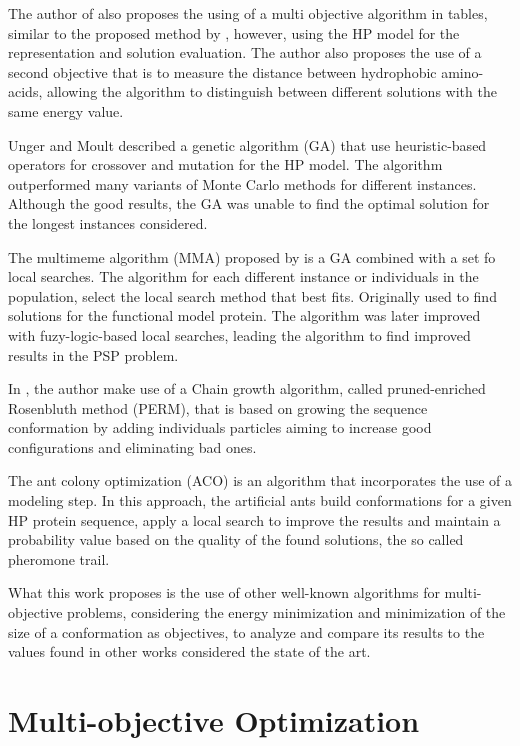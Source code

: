 The author of \cite{gabriel2012algoritmos} also proposes the using of a multi objective algorithm in tables, similar to the proposed method by \cite{soares2011investigating}, however, using the HP model for the representation and solution evaluation. The author also proposes the use of a second objective that is to measure the distance between hydrophobic amino-acids, allowing the algorithm to distinguish between different solutions with the same energy value.


Unger and Moult \cite{unger1993genetic} described a genetic algorithm (GA) that use heuristic-based operators for crossover and mutation for the HP model. The algorithm outperformed many variants of Monte Carlo methods for different instances. Although the good results, the GA was unable to find the optimal solution for the longest instances considered.


The multimeme algorithm (MMA) proposed by \cite{krasnogor2002multimeme} is a GA combined with a set fo local searches. The algorithm for each different instance or individuals in the population, select the local search method that best fits. Originally used to find solutions for the functional model protein. The algorithm was later improved with fuzy-logic-based local searches, leading the algorithm to find improved results in the PSP problem.


In \cite{hsu2003growth}, the author make use of a Chain growth algorithm, called pruned-enriched Rosenbluth method (PERM), that is based on growing the sequence conformation by adding individuals particles aiming to increase good configurations and eliminating bad ones.


The ant colony optimization (ACO) \cite{shmygelska2002ant, shmygelska2003improved} is an algorithm that incorporates the use of a modeling step. In this approach, the artificial ants build conformations for a given HP protein sequence, apply a local search to improve the results and maintain a probability value based on the quality of the found solutions, the so called pheromone trail.


What this work proposes is the use of other well-known algorithms for multi-objective problems, considering the energy minimization and minimization of the size of a conformation as objectives, to analyze and compare its results to the values found in other works considered the state of the art.


\section{Multi-objective Optimization} \label{sec:optimization}


